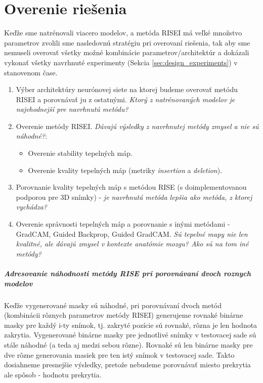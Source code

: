 \chapter{Overenie riešenia}

Keďže sme natrénovali viacero modelov, a metóda RISEI má veľké množstvo parametrov zvolili sme nasledovnú stratégiu pri overovaní riešenia, tak aby sme nemuseli overovať všetky možné kombinácie parametrov/architektúr a dokázali vykonať všetky navrhnuté experimenty (Sekcia \ref{sec:design_experiments}) v stanovenom čase.

\begin{enumerate}
    \item Výber architektúry neurónovej siete na ktorej budeme overovať metódu RISEI a porovnávať ju z ostatnými. \textit{Ktorý z natrénovaných modelov je najvhodnejší pre navrhnutú metódu?}
    \item Overenie metódy RISEI. \textit{Dávajú výsledky z navrhnutej metódy zmysel a nie sú náhodné?}: 
         \begin{itemize}
             \item Overenie stability tepelných máp.
             \item Overenie kvality tepelných máp (metriky \textit{insertion} a \textit{deletion}).
         \end{itemize}
    \item Porovnanie kvality tepelných máp s metódou RISE (s doimplementovanou podporou pre 3D snímky) - \textit{je navrhnutá metóda lepšia ako metóda, z ktorej vychádza?}
    \item Overenie správnosti tepelných máp a porovnanie s inými metódami - GradCAM, Guided Backprop, Guided GradCAM. \textit{Sú tepelné mapy nie len kvalitné, ale dávajú zmysel v kontexte anatómie mozgu? Ako sú na tom iné metódy?}
\end{enumerate}

\paragraph{Adresovanie náhodnosti metódy RISE pri porovnávaní dvoch roznych modelov}

Keďže vygenerované masky sú náhodné, pri porovnávaní dvoch metód (kombinácii rôznych parametrov metódy RISEI) generujeme rovnaké binárne masky pre každý i-ty snímok, tj. zakryté pozície sú rovnaké, rôzna je len hodnota zakrytia. Vygenerované binárne masky pre jednotlivé snímky v testovacej sade sú stále náhodné (a teda aj medzi sebou rôzne). Rovnaké sú len binárne masky pre dve rôzne generovania masiek pre ten istý snímok v testovacej sade. Takto dosiahneme presnejšie výsledky, pretože nebudeme porovnávať miesto prekrytia ale spôsob - hodnotu prekrytia.

